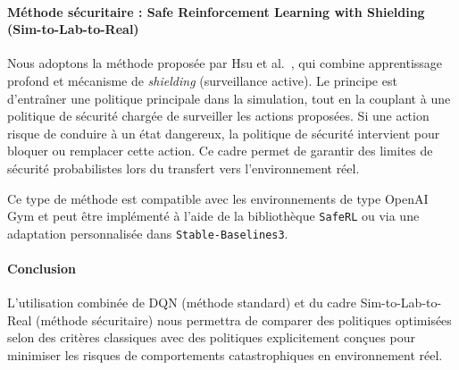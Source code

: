 \documentclass{article}
\begin{document}
\paragraph{Méthode sécuritaire : Safe Reinforcement Learning with Shielding (Sim-to-Lab-to-Real)}
Nous adoptons la méthode proposée par Hsu et al.~\cite{hsu2022sim2real}, qui combine apprentissage profond et mécanisme de \textit{shielding} (surveillance active). Le principe est d’entraîner une politique principale dans la simulation, tout en la couplant à une politique de sécurité chargée de surveiller les actions proposées. Si une action risque de conduire à un état dangereux, la politique de sécurité intervient pour bloquer ou remplacer cette action. Ce cadre permet de garantir des limites de sécurité probabilistes lors du transfert vers l’environnement réel.

Ce type de méthode est compatible avec les environnements de type OpenAI Gym et peut être implémenté à l’aide de la bibliothèque \texttt{SafeRL} ou via une adaptation personnalisée dans \texttt{Stable-Baselines3}.

\paragraph{Conclusion}
L’utilisation combinée de DQN (méthode standard) et du cadre Sim-to-Lab-to-Real (méthode sécuritaire) nous permettra de comparer des politiques optimisées selon des critères classiques avec des politiques explicitement conçues pour minimiser les risques de comportements catastrophiques en environnement réel.



\end{document}
